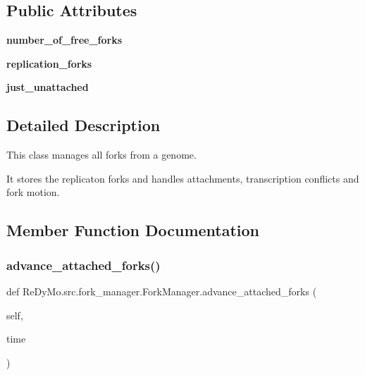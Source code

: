 \subsection*{Public Attributes}
\begin{DoxyCompactItemize}
\item 
\mbox{\label{classReDyMo_1_1src_1_1fork__manager_1_1ForkManager_ad12c386723c59b2ecb1eaadb28c437bb}} 
{\bfseries number\+\_\+of\+\_\+free\+\_\+forks}
\item 
\mbox{\label{classReDyMo_1_1src_1_1fork__manager_1_1ForkManager_a7aecf39ae941edfe12a72d644549a5c0}} 
{\bfseries replication\+\_\+forks}
\item 
\mbox{\label{classReDyMo_1_1src_1_1fork__manager_1_1ForkManager_a1f453944009a835815c3600293961cd5}} 
{\bfseries just\+\_\+unattached}
\end{DoxyCompactItemize}


\subsection{Detailed Description}
This class manages all forks from a genome. 

It stores the replicaton forks and handles attachments, transcription conflicts and fork motion. 

\subsection{Member Function Documentation}
\mbox{\label{classReDyMo_1_1src_1_1fork__manager_1_1ForkManager_a78145066ccb9f6b3d86bb0c08aed2bb6}} 
\subsubsection{\texorpdfstring{advance\+\_\+attached\+\_\+forks()}{advance\_attached\_forks()}}
{\footnotesize\ttfamily def Re\+Dy\+Mo.\+src.\+fork\+\_\+manager.\+Fork\+Manager.\+advance\+\_\+attached\+\_\+forks (\begin{DoxyParamCaption}\item[{}]{self,  }\item[{}]{time }\end{DoxyParamCaption})}



